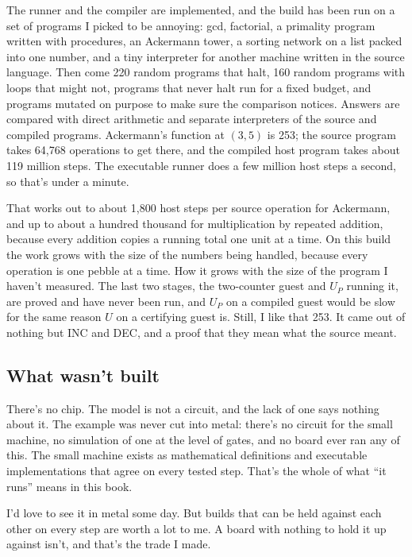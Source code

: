\documentclass[11pt,twoside]{article}
\theoremstyle{thielethm}
\theoremstyle{thieledef}
\theoremstyle{thieledef}
\theoremstyle{thieledef}
\theoremstyle{thielethm}
\theoremstyle{thieleobs}
\theoremstyle{thielethm}
\begin{document}
The runner and the compiler are implemented, and the build has been run on a set of programs I picked
to be annoying: gcd, factorial, a primality program written with procedures, an Ackermann tower, a sorting
network on a list packed into one number, and a tiny interpreter for another machine written in the
source language. Then come 220 random programs that halt, 160 random programs with loops that might not,
programs that never halt run for a fixed budget, and programs mutated on purpose to make sure the
comparison notices. Answers are compared with direct arithmetic and separate interpreters of the source and
compiled programs. Ackermann's function at $(3, 5)$ is 253; the
source program takes 64,768 operations to get there, and the compiled host program takes about 119
million steps. The executable runner does a few million host steps a second, so that's under a minute.

That works out to about 1,800 host steps per source operation for Ackermann, and up to about a hundred thousand
for multiplication by repeated addition, because every addition copies a running total one unit at a
time. On this build the work grows with the size of the numbers being handled, because every
operation is one pebble at a time. How it grows with the size of the program I haven't
measured. The last two stages, the two-counter guest and $U_P$ running it, are proved and have
never been run, and $U_P$ on a compiled guest would be slow for the same reason $U$ on a
certifying guest is. Still, I like that 253. It came out of nothing but INC and DEC, and a proof
that they mean what the source meant.

\subsection{What wasn't built}

There's no chip. The model is not a circuit, and the lack of one says nothing about it. The example was never cut into metal: there's no circuit for the small machine, no
simulation of one at the level of gates, and no board ever ran any of this. The small machine exists
as mathematical definitions and executable implementations that
agree on every tested step. That's the whole of what ``it runs'' means in this book.

I'd love to see it in metal some day. But builds that can be held against each other on every step are worth a lot to
me.
A board with nothing to hold it up against isn't, and that's the trade I made.
\end{document}
